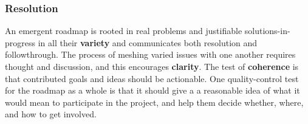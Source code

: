 \subsubsection*{Resolution}
An emergent roadmap is rooted in real problems and justifiable
solutions-in-progress in all their \textbf{variety} and communicates
both resolution and followthrough.  The process of meshing varied
issues with one another requires thought and discussion, and this
encourages \textbf{clarity}.  The test of \textbf{coherence} is that
contributed goals and ideas should be actionable.
%
One quality-control test for the roadmap as a whole is that it should
give a  a reasonable idea of what it would
mean to participate in the project, and help them decide whether,
where, and how to get involved.


